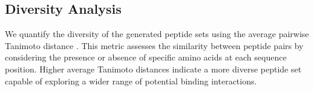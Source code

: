 \subsection{Diversity Analysis}
We quantify the diversity of the generated peptide sets using the average pairwise Tanimoto distance \cite{bajusz2015sim, tanimoto1958elementary}. This metric assesses the similarity between peptide pairs by considering the presence or absence of specific amino acids at each sequence position. Higher average Tanimoto distances indicate a more diverse peptide set capable of exploring a wider range of potential binding interactions.

